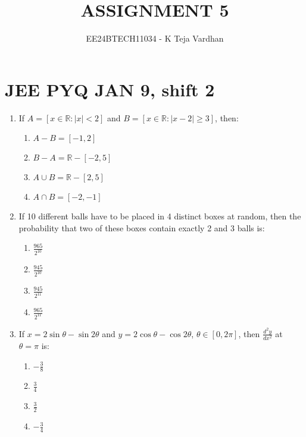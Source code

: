 \documentclass[journal]{IEEEtran}
\newcommand{\sbrak}[1]{\left[ #1 \right]}
\newcommand{\abs}[1]{\left| #1 \right|}
\begin{document}

\title{ASSIGNMENT 5}
\author{EE24BTECH11034 - K Teja Vardhan}
{\let\newpage\relax\maketitle}

\section{JEE PYQ JAN 9, shift 2}
\begin{enumerate}

    \item If \( A = \sbrak{ x \in \mathbb{R} : \abs{x} < 2 } \) and \( B = \sbrak{ x \in \mathbb{R} : \abs{x - 2} \geq 3 } \), then:
        
        \begin{enumerate}
            \item \( A - B = \sbrak{ -1, 2 } \)  
            \item \( B - A = \mathbb{R} - \sbrak{ -2, 5 } \)  
            \item \( A \cup B = \mathbb{R} - \sbrak{ 2, 5 } \)  
            \item \( A \cap B = \sbrak{ -2, -1 } \)
        \end{enumerate}
        

    \item If 10 different balls have to be placed in 4 distinct boxes at random, then the probability that two of these boxes contain exactly 2 and 3 balls is:
        \begin{multicols}{4}
        \begin{enumerate}
            \item \( \frac{965}{2^{10}} \)  
            \item \( \frac{945}{2^{10}} \)  
            \item \( \frac{945}{2^{11}} \)  
            \item \( \frac{965}{2^{11}} \)
        \end{enumerate}
        \end{multicols}

    \item If \( x = 2 \sin \theta - \sin 2 \theta \) and \( y = 2 \cos \theta - \cos 2 \theta \), \( \theta \in \sbrak{ 0, 2\pi } \), then \( \frac{d^2y}{dx^2} \) at \( \theta = \pi \) is:
        \begin{multicols}{4}
        \begin{enumerate}
            \item \( -\frac{3}{8} \)  
            \item \( \frac{3}{4} \)  
            \item \( \frac{3}{2} \)  
            \item \( -\frac{3}{4} \)
        \end{enumerate}
        \end{multicols}


\end{enumerate}
\end{document}
